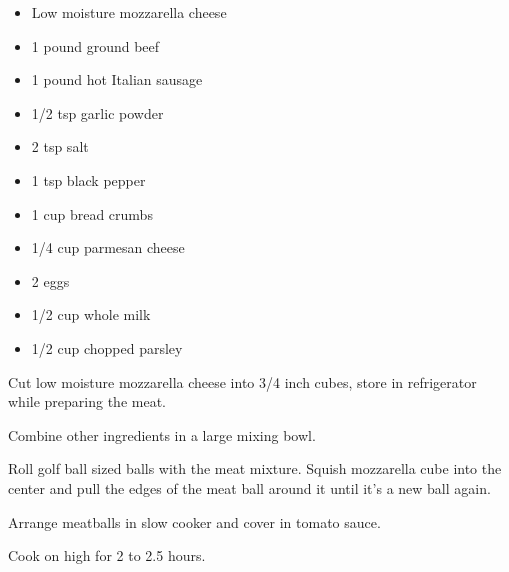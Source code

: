 
 
\ingredients
\begin{itemize}
		\item Low moisture mozzarella cheese
        \item 1 pound ground beef
        \item 1 pound hot Italian sausage
        \item 1/2 tsp garlic powder
        \item 2 tsp salt
        \item 1 tsp black pepper
        \item 1 cup bread crumbs
        \item 1/4 cup parmesan cheese
        \item 2 eggs
        \item 1/2 cup whole milk
        \item 1/2 cup chopped parsley
\end{itemize}

\instructions

Cut low moisture mozzarella cheese into 3/4 inch cubes, store in
refrigerator while preparing the meat.

Combine other ingredients in a large mixing bowl.

Roll golf ball sized balls with the meat mixture. Squish mozzarella cube
into the center and pull the edges of the meat ball around it until it's
a new ball again.
 
Arrange meatballs in slow cooker and cover in tomato sauce. 
 
Cook on high for 2 to 2.5 hours.
